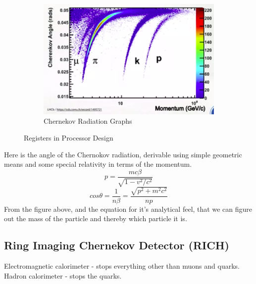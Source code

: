 \begin{figure}[H]
\begin{subfigure}[b]{0.45\textwidth}
    \includegraphics[width=\linewidth]{img/hadron/particleid-chernekov-graph.png}
    \caption{Chernekov Radiation Graphs}
    \label{fig:particleid-cherenkov-angles}
\end{subfigure}
\caption{Registers in Processor Design}
\end{figure}

Here is the angle of the Chernokov radiation, derivable using simple geometric means and some special relativity in terms of the momentum.
\begin{equation}
  p = \frac{mc\beta}{\sqrt{1 - v^2/c^2}}
\end{equation}
\begin{equation}
  cos \theta = \frac{1}{n\beta} = \frac{\sqrt{p^2 + m^2c^2}}{np}
\end{equation}
From the figure above, and the equation for it's analytical feel, that we can figure out the mass of the particle and thereby which particle it is.


\subsection{Ring Imaging Chernekov Detector (RICH)}

Electromagnetic calorimeter - stops everything other than muons and quarks.
Hadron calorimeter - stops the quarks.